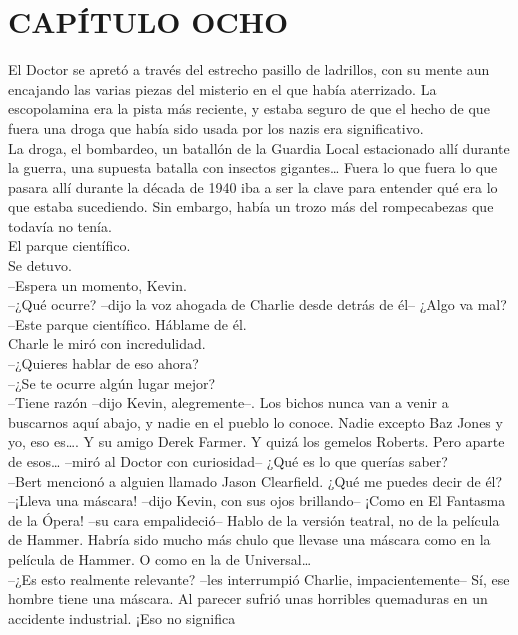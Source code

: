 \chapter*{CAPÍTULO OCHO}
El Doctor se apretó a través del estrecho pasillo de ladrillos, con su
mente aun encajando las varias piezas del misterio en el que había
aterrizado. La escopolamina era la pista más reciente, y estaba seguro
de que el hecho de que fuera una droga que había sido usada por los
nazis era significativo.\\
La droga, el bombardeo, un batallón de la Guardia Local estacionado allí
durante la guerra, una supuesta batalla con insectos gigantes\ldots{}
Fuera lo que fuera lo que pasara allí durante la década de 1940 iba a
ser la clave para entender qué era lo que estaba sucediendo. Sin
embargo, había un trozo más del rompecabezas que todavía no tenía.\\
El parque científico.\\
Se detuvo.\\
--Espera un momento, Kevin.\\
--¿Qué ocurre? --dijo la voz ahogada de Charlie desde detrás de él--
¿Algo va mal?\\
--Este parque científico. Háblame de él.\\
Charle le miró con incredulidad.\\
--¿Quieres hablar de eso ahora?\\
--¿Se te ocurre algún lugar mejor?\\
--Tiene razón --dijo Kevin, alegremente--. Los bichos nunca van a venir
a buscarnos aquí abajo, y nadie en el pueblo lo conoce. Nadie excepto
Baz Jones y yo, eso es\ldots{}. Y su amigo Derek Farmer. Y quizá los
gemelos Roberts. Pero aparte de esos\ldots{} --miró al Doctor con
curiosidad-- ¿Qué es lo que querías saber?\\
--Bert mencionó a alguien llamado Jason Clearfield. ¿Qué me puedes decir
de él?\\
--¡Lleva una máscara! --dijo Kevin, con sus ojos brillando-- ¡Como en El
Fantasma de la Ópera! --su cara empalideció-- Hablo de la versión
teatral, no de la película de Hammer. Habría sido mucho más chulo que
llevase una máscara como en la película de Hammer. O como en la de
Universal\ldots{}\\
--¿Es esto realmente relevante? --les interrumpió Charlie,
impacientemente-- Sí, ese hombre tiene una máscara. Al parecer sufrió
unas horribles quemaduras en un accidente industrial. ¡Eso no significa
